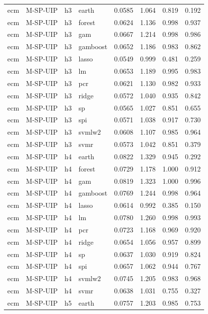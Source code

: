 \begin{ThreePartTable}
\begin{longtable}[t]{llclcccc}
\addlinespace
ecm & M-SP-UIP & h3 & earth & 0.0585 & 1.064 & 0.819 & 0.192\\
ecm & M-SP-UIP & h3 & forest & 0.0624 & 1.136 & 0.998 & 0.937\\
ecm & M-SP-UIP & h3 & gam & 0.0667 & 1.214 & 0.998 & 0.986\\
ecm & M-SP-UIP & h3 & gamboost & 0.0652 & 1.186 & 0.983 & 0.862\\
ecm & M-SP-UIP & h3 & lasso & 0.0549 & 0.999 & 0.481 & 0.259\\
ecm & M-SP-UIP & h3 & lm & 0.0653 & 1.189 & 0.995 & 0.983\\
ecm & M-SP-UIP & h3 & pcr & 0.0621 & 1.130 & 0.982 & 0.933\\
ecm & M-SP-UIP & h3 & ridge & 0.0572 & 1.040 & 0.935 & 0.842\\
ecm & M-SP-UIP & h3 & sp & 0.0565 & 1.027 & 0.851 & 0.655\\
ecm & M-SP-UIP & h3 & spi & 0.0571 & 1.038 & 0.917 & 0.730\\
ecm & M-SP-UIP & h3 & svmlw2 & 0.0608 & 1.107 & 0.985 & 0.964\\
ecm & M-SP-UIP & h3 & svmr & 0.0573 & 1.042 & 0.851 & 0.379\\
\addlinespace
ecm & M-SP-UIP & h4 & earth & 0.0822 & 1.329 & 0.945 & 0.292\\
ecm & M-SP-UIP & h4 & forest & 0.0729 & 1.178 & 1.000 & 0.912\\
ecm & M-SP-UIP & h4 & gam & 0.0819 & 1.323 & 1.000 & 0.996\\
ecm & M-SP-UIP & h4 & gamboost & 0.0769 & 1.244 & 0.998 & 0.964\\
ecm & M-SP-UIP & h4 & lasso & 0.0614 & 0.992 & 0.385 & 0.150\\
ecm & M-SP-UIP & h4 & lm & 0.0780 & 1.260 & 0.998 & 0.993\\
ecm & M-SP-UIP & h4 & pcr & 0.0723 & 1.168 & 0.969 & 0.920\\
ecm & M-SP-UIP & h4 & ridge & 0.0654 & 1.056 & 0.957 & 0.899\\
ecm & M-SP-UIP & h4 & sp & 0.0637 & 1.030 & 0.919 & 0.824\\
ecm & M-SP-UIP & h4 & spi & 0.0657 & 1.062 & 0.944 & 0.767\\
ecm & M-SP-UIP & h4 & svmlw2 & 0.0745 & 1.205 & 0.983 & 0.968\\
ecm & M-SP-UIP & h4 & svmr & 0.0638 & 1.031 & 0.755 & 0.327\\
\addlinespace
ecm & M-SP-UIP & h5 & earth & 0.0757 & 1.203 & 0.985 & 0.753\\

\end{longtable}
\end{ThreePartTable}
